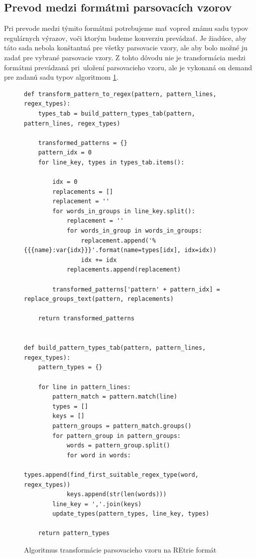 \subsection{Prevod medzi formátmi parsovacích vzorov}
\label{sec:format-transformation}

Pri prevode medzi týmito formátmi potrebujeme mať vopred známu sadu typov regulárnych výrazov, voči ktorým budeme konverziu prevádzať. Je žiadúce, aby táto sada nebola konštantná pre všetky parsovacie vzory, ale aby bolo možné ju zadať pre vybrané parsovacie vzory. Z tohto dôvodu nie je transformácia medzi formátmi prevádzaná pri~uložení parsovacieho vzoru, ale je vykonaná on demand pre zadanú sadu typov algoritmom \ref{fig:pattern-transformation}.

\begin{figure}[htbp]
\centering
\begin{minipage}{0.9\textwidth}
\lstset{tabsize=4,columns=flexible,breaklines=true,breakatwhitespace=true, showstringspaces=false}
\begin{lstlisting}
def transform_pattern_to_regex(pattern, pattern_lines, regex_types):
    types_tab = build_pattern_types_tab(pattern, pattern_lines, regex_types)

    transformed_patterns = {}
    pattern_idx = 0
    for line_key, types in types_tab.items():

        idx = 0
        replacements = []
        replacement = ''
        for words_in_groups in line_key.split():
            replacement = ''
            for words_in_group in words_in_groups:
                replacement.append('%{{{name}:var{idx}}}'.format(name=types[idx], idx=idx))
                idx += idx
            replacements.append(replacement)
            
        transformed_patterns['pattern' + pattern_idx] = replace_groups_text(pattern, replacements)

    return transformed_patterns


def build_pattern_types_tab(pattern, pattern_lines, regex_types):
    pattern_types = {}

    for line in pattern_lines:
        pattern_match = pattern.match(line)
        types = []
        keys = []
        pattern_groups = pattern_match.groups()
        for pattern_group in pattern_groups:
            words = pattern_group.split()
            for word in words:
                types.append(find_first_suitable_regex_type(word, regex_types))
            keys.append(str(len(words)))
        line_key = ','.join(keys)
        update_types(pattern_types, line_key, types)

    return pattern_types
\end{lstlisting} 		
\end{minipage} 
\caption{Algoritmus transformácie parsovacieho vzoru na REtrie formát}
\label{fig:pattern-transformation}
\end{figure}

